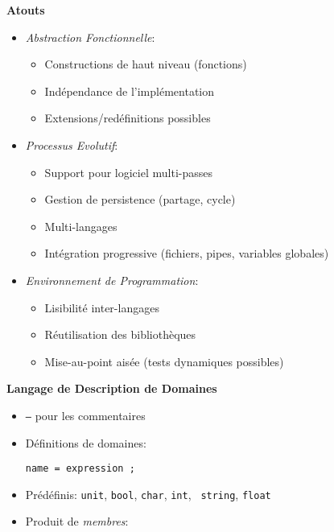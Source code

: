\documentclass[11pt]{article}
\begin{document}
{\newpage

\begin{center}
{\huge\bf Atouts}
\end{center}

\vskip 2cm

\begin{itemize}
\item {\em Abstraction Fonctionnelle}: 
        \begin{itemize}
        \item Constructions de haut niveau (fonctions)
        \item Indépendance de l'implémentation
        \item Extensions/redéfinitions possibles
        \end{itemize}
\item {\em Processus Evolutif}: 
        \begin{itemize}
        \item Support pour logiciel multi-passes
        \item Gestion de persistence (partage, cycle)
        \item Multi-langages
        \item Intégration progressive (fichiers, pipes, variables
                globales) 
        \end{itemize}
\item {\em Environnement de Programmation}:
        \begin{itemize}
        \item Lisibilité inter-langages
        \item Réutilisation des bibliothèques
        \item Mise-au-point aisée (tests dynamiques possibles)
        \end{itemize}
\end{itemize}

\newpage

\begin{center}
{\huge\bf Langage de Description de Domaines}
\end{center}

\vskip 2cm

\begin{itemize}
\item {\tt --} pour les commentaires
\item Définitions de domaines: 

\begin{verbatim}
name = expression ;
\end{verbatim}
\item Prédéfinis: {\tt unit}, {\tt bool}, {\tt char}, {\tt int}, {\tt
string}, {\tt float} 
\item Produit de {\em membres}:


\end{itemize}}
\end{document}
